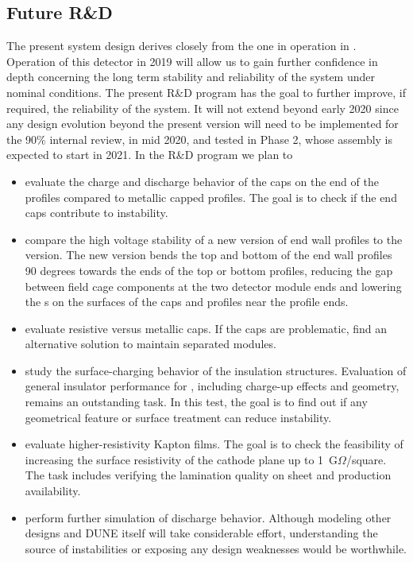 \subsection{Future R\&D}
\label{sec:fdsp-hv-protodune-RD}

The present  system design derives closely from the one in operation in .  Operation of this detector in 2019 will allow us to gain further confidence in depth concerning the long term stability and reliability of the  system under nominal conditions.  The present R\&D program has the goal to further improve, if required, the reliability of the system. It will not extend beyond early 2020 since any design evolution beyond the present version will need to be implemented for the 90\% internal review, in mid 2020, and tested in  Phase 2, whose assembly is expected to start in 2021. In the R\&D program we plan to  %

\begin{itemize}
\item evaluate the charge and discharge behavior of the  caps on the end of the profiles compared to metallic capped profiles.  The goal is to check if the end caps contribute to  instability. 

\item compare the high voltage stability of a new version of end wall profiles to the  version.  The new version bends the top and bottom of the end wall profiles 90 degrees towards the ends of the top or bottom profiles, reducing the gap between field cage components at the two detector module ends and lowering the \efield{}s on the surfaces of the  caps and profiles near the profile ends.
\item evaluate resistive versus metallic caps.  If the  caps are %
problematic, find an alternative solution to maintain separated  modules.
\item study the surface-charging behavior of the  insulation structures.  Evaluation of general insulator performance for , including charge-up effects and geometry, remains an outstanding task.  In this test, the goal is to find out if any geometrical feature or surface treatment can reduce  instability.
\item evaluate higher-resistivity Kapton films.  The goal is to check the feasibility of increasing the surface resistivity of the cathode plane up to 1~G$\Omega$/square.  The task includes verifying the lamination quality on \frfour sheet and production availability.
\item perform further simulation of   discharge behavior. Although modeling other  designs and DUNE itself will take considerable effort, %
understanding the source of instabilities or exposing any design weaknesses would be worthwhile. %
\end{itemize}

